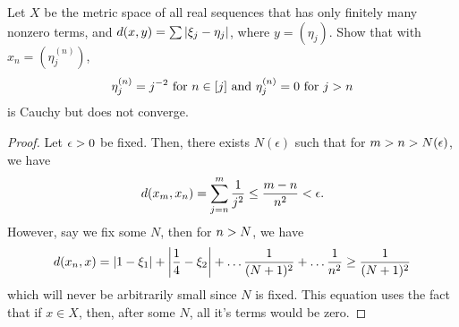 \begin{question}
    Let $X$ be the metric space of all real sequences that has only finitely many nonzero terms, and $d(x,y) = \sum \left\lvert \xi_j - \eta_j \right\rvert$, where $y = (\eta_j)$. Show that with $x_n = (\eta^{(n)}_j)$,
    \[\eta^{(n)}_j = j^{-2} \text{ for } n \in [j] \text{ and } \eta^{(n)}_j = 0 \text{ for } j > n\]
    is Cauchy but does not converge.
    \label{section1.5-15}
\end{question}
\begin{proof}
    Let $\epsilon > 0$ be fixed. Then, there exists $N(\epsilon)$ such that for $m > n > N(\epsilon)$, we have
    \[d(x_m , x_n) = \sum_{j = n}^m \frac{1}{j^2} \leq \frac{m-n}{n^2} < \epsilon.\]
    However, say we fix some $N$, then for $n > N$, we have
    \[d(x_n , x) = \left\lvert 1 - \xi_1 \right\rvert + \left\lvert \frac{1}{4} - \xi_2 \right\rvert + \ldots \frac{1}{(N+1)^2} + \ldots \frac{1}{n^2} \geq \frac{1}{(N+1)^2}\]
    which will never be arbitrarily small since $N$ is fixed. This equation uses the fact that if $ x \in X$, then, after some $N$, all it's terms would be zero.
\end{proof}
